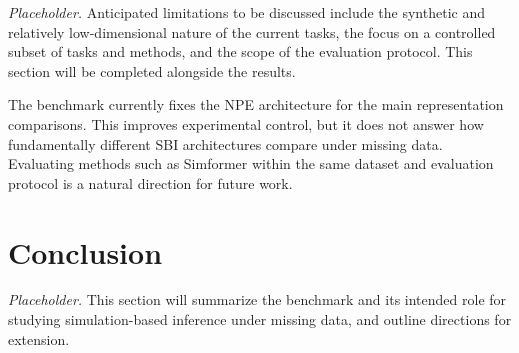 \documentclass{article} %
\begin{document}
\textit{Placeholder.} Anticipated limitations to be discussed include the
synthetic and relatively low-dimensional nature of the current tasks, the focus on
a controlled subset of tasks and methods, and the scope of the
evaluation protocol. This section will be completed alongside the results.

The benchmark currently fixes the NPE architecture for the main representation
comparisons. This improves experimental control, but it does not answer how
fundamentally different SBI architectures compare under missing data. Evaluating
methods such as Simformer within the same dataset and evaluation protocol is a
natural direction for future work.

\section{Conclusion}
\label{sec:conclusion}

\textit{Placeholder.} This section will summarize the benchmark and its intended
role for studying simulation-based inference under missing data, and outline
directions for extension.



\end{document}
